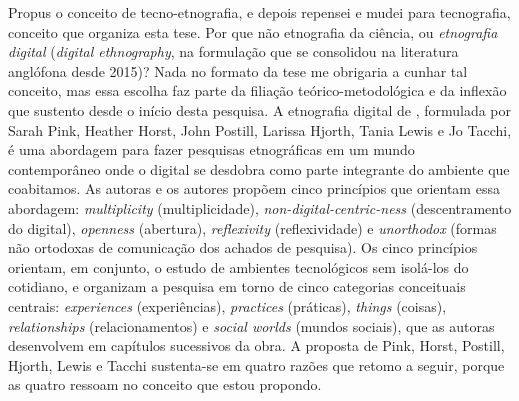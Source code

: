 Propus o conceito de tecno-etnografia, e depois repensei e mudei para tecnografia, conceito que organiza esta tese. Por que não etnografia da ciência, ou \emph{etnografia digital} (\textit{digital ethnography}, na formulação que se consolidou na literatura anglófona desde 2015)? Nada no formato da tese me obrigaria a cunhar tal conceito, mas essa escolha faz parte da filiação teórico-metodológica e da inflexão que sustento desde o início desta pesquisa. A etnografia digital de \textcite{Pink2016DigitalEthnography}, formulada por Sarah Pink, Heather Horst, John Postill, Larissa Hjorth, Tania Lewis e Jo Tacchi, é uma abordagem para fazer pesquisas etnográficas em um mundo contemporâneo onde o digital se desdobra como parte integrante do ambiente que coabitamos. As autoras e os autores propõem cinco princípios que orientam essa abordagem: \emph{multiplicity} (multiplicidade), \emph{non-digital-centric-ness} (descentramento do digital), \emph{openness} (abertura), \emph{reflexivity} (reflexividade) e \emph{unorthodox} (formas não ortodoxas de comunicação dos achados de pesquisa). Os cinco princípios orientam, em conjunto, o estudo de ambientes tecnológicos sem isolá-los do cotidiano, e organizam a pesquisa em torno de cinco categorias conceituais centrais: \emph{experiences} (experiências), \emph{practices} (práticas), \emph{things} (coisas), \emph{relationships} (relacionamentos) e \emph{social worlds} (mundos sociais), que as autoras desenvolvem em capítulos sucessivos da obra. A proposta de Pink, Horst, Postill, Hjorth, Lewis e Tacchi sustenta-se em quatro razões que retomo a seguir, porque as quatro ressoam no conceito que estou propondo.

